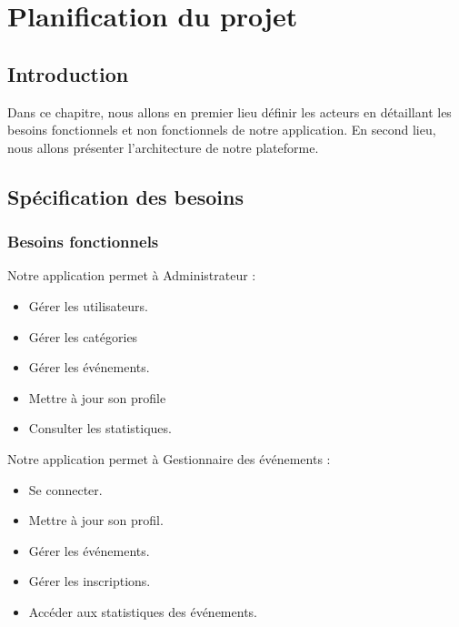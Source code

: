 \chapter{Planification du projet}

 


\section*{Introduction}
Dans ce chapitre, nous allons en premier lieu définir les acteurs en détaillant les besoins fonctionnels et non fonctionnels de notre application. En second lieu, nous allons présenter l’architecture de notre plateforme.

\renewcommand{\thesection}{\Roman{section}.} 
\renewcommand{\thesubsection}{\arabic{subsection}.}
\renewcommand{\thesubsubsection}{\thesubsection\arabic{subsubsection}}

\section{Spécification des besoins}


\subsection{Besoins fonctionnels}

Notre application permet à Administrateur :
\begin{itemize}
    \item Gérer les utilisateurs.
    \item Gérer les catégories
    \item Gérer les événements.
    \item Mettre à jour son profile
    \item Consulter les statistiques.
\end{itemize}

Notre application permet à Gestionnaire des événements :
\begin{itemize}
    \item Se connecter.
    \item Mettre à jour son profil.
    \item Gérer les événements.
    \item Gérer les inscriptions.
    \item Accéder aux statistiques des événements.
\end{itemize}

